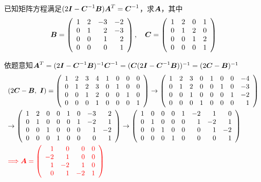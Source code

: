 \begin{frame}
\begin{li}[2009-2010第二学期]
已知矩阵方程满足$(2\boldsymbol{I}-\boldsymbol{C}^{-1}\boldsymbol{B})\boldsymbol{A}^T=\boldsymbol{C}^{-1}$，求$\boldsymbol{A}$，其中
$$\boldsymbol{B}=\left(
\begin{array}{rrrr}
1&2&-3&-2\\
0&1&2&-3\\
0&0&1&2\\
0&0&0&1
\end{array}
\right),\quad
\boldsymbol{C}=\left(
\begin{array}{rrrr}
1&2&0&1\\
0&1&2&0\\
0&0&1&2\\
0&0&0&1
\end{array}
\right)$$
\end{li}
\pause

\begin{jie}
依题意知$\boldsymbol{A}^T=(2\boldsymbol{I}-\boldsymbol{C}^{-1}\boldsymbol{B})^{-1}\boldsymbol{C}^{-1}=(\boldsymbol{C}(2\boldsymbol{I}-\boldsymbol{C}^{-1}\boldsymbol{B}))^{-1}=(2\boldsymbol{C}-\boldsymbol{B})^{-1}$
$$
\begin{array}{l}
  (2\boldsymbol{C}-\boldsymbol{B},~\boldsymbol{I})=\left(
  \begin{array}{rrrrrrrr}
    1&2&3&4&1&0&0&0\\
    0&1&2&3&0&1&0&0\\
    0&0&1&2&0&0&1&0\\
    0&0&0&1&0&0&0&1
  \end{array}
  \right)\rightarrow\left(
  \begin{array}{rrrrrrrr}
    1&2&3&0&1&0&0&-4\\
    0&1&2&0&0&1&0&-3\\
    0&0&1&0&0&0&1&-2\\
    0&0&0&1&0&0&0&1
  \end{array}
  \right)\\[0.3in]
\rightarrow\left(
  \begin{array}{rrrrrrrr}
    1&2&0&0&1&0&-3&2\\
    0&1&0&0&0&1&-2&1\\
    0&0&1&0&0&0&1&-2\\
    0&0&0&1&0&0&0&1
  \end{array}
  \right)
\rightarrow\left(
  \begin{array}{rrrrrrrr}
    1&0&0&0&1&-2&1&0\\
    0&1&0&0&0&1&-2&1\\
    0&0&1&0&0&0&1&-2\\
    0&0&0&1&0&0&0&1   
  \end{array}
  \right)\\[0.3in]
  \textcolor{red}{\Longrightarrow \boldsymbol{A}=\left(
  \begin{array}{rrrr}
    1&0&0&0\\
    -2&1&0&0\\
    1&-2&1&0\\
    0&1&-2&1   
  \end{array}
  \right)
}
\end{array}
$$
\end{jie}

\end{frame}

